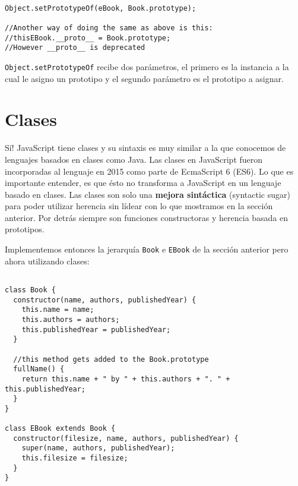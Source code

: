 \documentclass[a4paper, oneside, titlepage, 12pt]{paper}
\begin{document}
\begin{verbatim}

Object.setPrototypeOf(eBook, Book.prototype);

//Another way of doing the same as above is this:
//thisEBook.__proto__ = Book.prototype;
//However __proto__ is deprecated
\end{verbatim}

\texttt{Object.setPrototypeOf} recibe dos parámetros, el primero es la instancia a la cual le asigno un prototipo y el segundo parámetro es el prototipo a asignar.

\section{Clases}

Sí! JavaScript tiene clases y su sintaxis es muy similar a la que conocemos de lenguajes basados en clases como Java. Las clases en JavaScript fueron incorporadas al lenguaje en 2015 como parte de EcmaScript 6 (ES6). Lo que es importante entender, es que ésto no transforma a JavaScript en un lenguaje basado en clases. Las clases son solo una \textbf{mejora sintáctica} (syntactic sugar) para poder utilizar herencia sin lídear con lo que mostramos en la sección anterior. Por detrás siempre son funciones constructoras y herencia basada en prototipos.
\newline

Implementemos entonces la jerarquía \texttt{Book} e \texttt{EBook} de la sección anterior pero ahora utilizando clases:

\begin{verbatim}

class Book {
  constructor(name, authors, publishedYear) {
    this.name = name;
    this.authors = authors;
    this.publishedYear = publishedYear;
  }

  //this method gets added to the Book.prototype
  fullName() {
    return this.name + " by " + this.authors + ". " + this.publishedYear;
  }
}

class EBook extends Book {
  constructor(filesize, name, authors, publishedYear) {
    super(name, authors, publishedYear);
    this.filesize = filesize;
  }
}
\end{verbatim}
\end{document}
